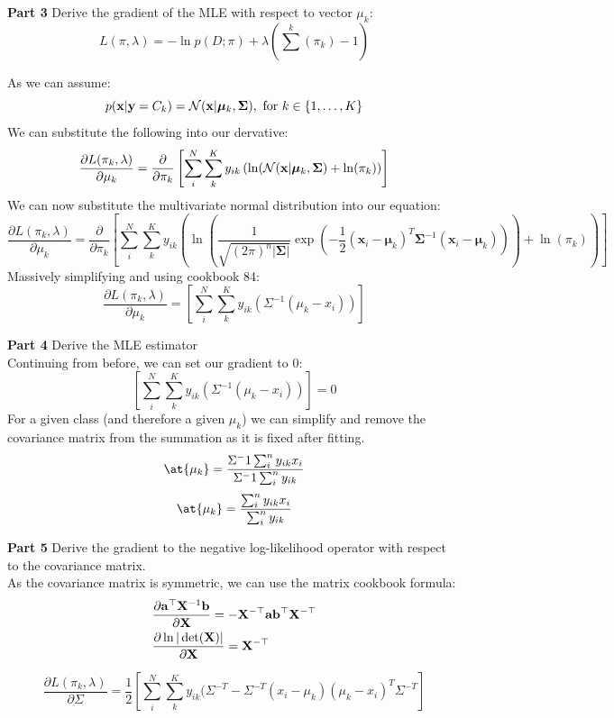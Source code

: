 \documentclass[submit]{harvardml}
\begin{document}
\item \textbf{Part 3} Derive the gradient of the MLE with respect to vector $\mu_k$:
$$
    L(\pi, \lambda) = -\ln p(D; \pi) + \lambda(\sum^k (\pi_k) -1)
$$

As we can assume:
$$p(\mathbf{x} | \mathbf{y} = C_k) = \mathcal{N}(\mathbf{x} |  \boldsymbol{\mu}_k, \mathbf{\Sigma}), \text{\ for\ }k \in \{1,\ldots, K\}$$
We can substitute the following into our dervative:
$$
    \frac{\partial L(\pi_k, \lambda)}{\partial \mu_k} = \frac{\partial}{\partial \pi_k} \left[ \sum^N_i \sum^K_k y_{ik} 
    \left( \ln ( \mathcal{N}(\mathbf{x} |  \boldsymbol{\mu}_k, \mathbf{\Sigma}) + \ln(\pi_k) \right) \right]
$$
We can now substitute the multivariate normal distribution into our equation:
$$
    \frac{\partial L(\pi_k, \lambda)}{\partial \mu_k} = \frac{\partial}{\partial \pi_k} \left[ \sum^N_i \sum^K_k y_{ik}
    \left( \ln 
    \left(\frac{1}{\sqrt{(2\pi)^n|\boldsymbol\Sigma|}}
    \exp\left(-\frac{1}{2}({\boldsymbol x_i}-{\boldsymbol \mu_k})^T {\boldsymbol\Sigma}^{-1}({\boldsymbol x_i}-{\boldsymbol \mu_k})
    \right)\right)
    + \ln(\pi_k) \right) \right]
$$
Massively simplifying and using cookbook 84:
$$
    \frac{\partial L(\pi_k, \lambda)}{\partial \mu_k} = \left[ \sum^N_i \sum^K_k y_{ik} ( \Sigma^{-1} (\mu_k -x_i))  \right]
$$

\item \textbf{Part 4} Derive the MLE estimator\\
Continuing from before, we can set our gradient to 0:
$$
    \left[ \sum^N_i \sum^K_k y_{ik} ( \Sigma^{-1} (\mu_k -x_i))  \right] = 0
$$
For a given class (and therefore a given $\mu_k$) we can simplify and remove the covariance matrix from the summation as it is fixed after fitting.\\
$$
    \at{\mu_k} = \frac{\Sigma^-1 \sum^n_i y_{ik}x_i}{\Sigma^-1 \sum^n_i y_{ik}} 
$$
$$
    \at{\mu_k} = \frac{ \sum^n_i y_{ik}x_i}{\sum^n_i y_{ik}} 
$$
\item \textbf{Part 5} Derive the gradient to the negative log-likelihood operator with respect to the covariance matrix.\\
As the covariance matrix is symmetric, we can use the matrix cookbook formula:
\begin{align*}
  & \frac{\partial \mathbf{a}^\top \mathbf{X}^{-1} \mathbf{b}}{\partial \mathbf{X}} = - \mathbf{X}^{-\top} \mathbf{a} \mathbf{b}^\top \mathbf{X}^{-\top} \\
  & \frac{\partial \ln | \det (\mathbf{X}) |}{\partial \mathbf{X}} = \mathbf{X}^{-\top}
 \end{align*}
 
$$
    \frac{\partial L(\pi_k, \lambda)}{\partial \Sigma} = \frac{1}{2} \left[ \sum^N_i \sum^K_k y_{ik} ( \Sigma^{-T} - \Sigma^{-T}(x_i - \mu_k)(\mu_k - x_i)^{T}\Sigma^{-T}   \right]
$$
\end{document}
